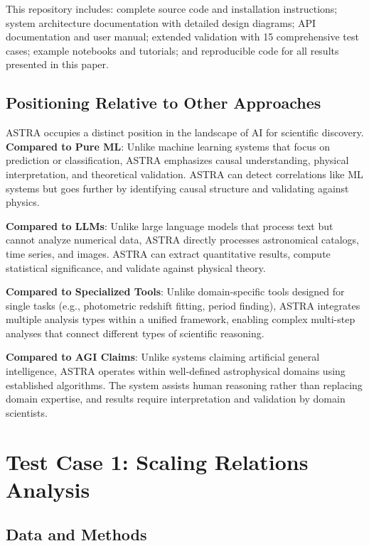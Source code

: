 \documentclass[usenatbib]{rasti}
\begin{document}
This repository includes: complete source code and installation instructions; system architecture documentation with detailed design diagrams; API documentation and user manual; extended validation with 15 comprehensive test cases; example notebooks and tutorials; and reproducible code for all results presented in this paper.

\subsection{Positioning Relative to Other Approaches}

ASTRA occupies a distinct position in the landscape of AI for scientific discovery. \textbf{Compared to Pure ML}: Unlike machine learning systems that focus on prediction or classification, ASTRA emphasizes causal understanding, physical interpretation, and theoretical validation. ASTRA can detect correlations like ML systems but goes further by identifying causal structure and validating against physics.

\textbf{Compared to LLMs}: Unlike large language models that process text but cannot analyze numerical data, ASTRA directly processes astronomical catalogs, time series, and images. ASTRA can extract quantitative results, compute statistical significance, and validate against physical theory.

\textbf{Compared to Specialized Tools}: Unlike domain-specific tools designed for single tasks (e.g., photometric redshift fitting, period finding), ASTRA integrates multiple analysis types within a unified framework, enabling complex multi-step analyses that connect different types of scientific reasoning.

\textbf{Compared to AGI Claims}: Unlike systems claiming artificial general intelligence, ASTRA operates within well-defined astrophysical domains using established algorithms. The system assists human reasoning rather than replacing domain expertise, and results require interpretation and validation by domain scientists.

\section{Test Case 1: Scaling Relations Analysis}

\subsection{Data and Methods}
\end{document}
